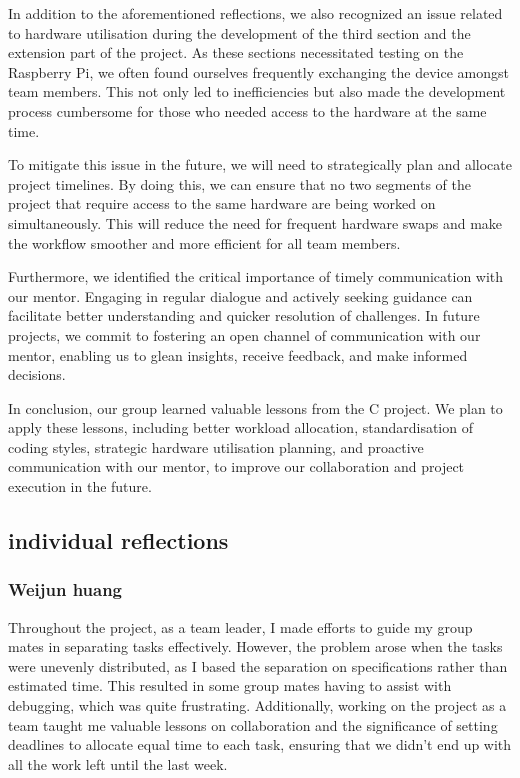 \documentclass[11pt]{article}
\begin{document}
In addition to the aforementioned reflections, we also recognized an issue related to hardware utilisation during the development of the third section and the extension part of the project. As these sections necessitated testing on the Raspberry Pi, we often found ourselves frequently exchanging the device amongst team members. This not only led to inefficiencies but also made the development process cumbersome for those who needed access to the hardware at the same time.

To mitigate this issue in the future, we will need to strategically plan and allocate project timelines. By doing this, we can ensure that no two segments of the project that require access to the same hardware are being worked on simultaneously. This will reduce the need for frequent hardware swaps and make the workflow smoother and more efficient for all team members.

Furthermore, we identified the critical importance of timely communication with our mentor. Engaging in regular dialogue and actively seeking guidance can facilitate better understanding and quicker resolution of challenges. In future projects, we commit to fostering an open channel of communication with our mentor, enabling us to glean insights, receive feedback, and make informed decisions.

In conclusion, our group learned valuable lessons from the C project. We plan to apply these lessons, including better workload allocation, standardisation of coding styles, strategic hardware utilisation planning, and proactive communication with our mentor, to improve our collaboration and project execution in the future.



\subsection{individual reflections}
\subsubsection{Weijun huang}
Throughout the project, as a team leader, I made efforts to guide my group mates in separating tasks effectively. However, the problem arose when the tasks were unevenly distributed, as I based the separation on specifications rather than estimated time. This resulted in some group mates having to assist with debugging, which was quite frustrating. Additionally, working on the project as a team taught me valuable lessons on collaboration and the significance of setting deadlines to allocate equal time to each task, ensuring that we didn't end up with all the work left until the last week. 
\end{document}
